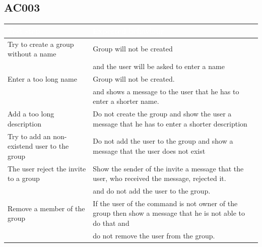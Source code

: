 \documentclass[12pt]{scrartcl}
\begin{document}
    \subsection{AC003}
        \begin{tabular}{|L{8cm}|L{8cm}|}
            \hline
            \textcolor{white}{Test step} & \textcolor{white}{Expected behaviour} \\ \hline
            Try to create a group without a name & Group will not be created\\ 
            & and the user will be asked to enter a name \\ \hline
            Enter a too long name & Group will not be created.\\
            &and shows a message to the user that he has to enter a shorter name. \\ \hline
            Add a too long description & Do not create the group and show the user a message that he has to enter a shorter description \\ \hline
            Try to add an non-existend user to the group & Do not add the user to the group and show a message that the user does not exist \\ \hline
            The user reject the invite to a group & Show the sender of the invite a message that the user, who received the message, rejected it. \\
            & and do not add the user to the group. \\ \hline
            Remove a member of the group & If the user of the command is not owner of the group then show a message that he is not able to do that and \\
            & do not remove the user from the group. \\ \hline
        \end{tabular}

\end{document}
